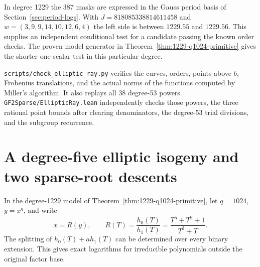 \documentclass[11pt]{article}
\begin{document}
In degree 1229 the 387 masks are expressed in the Gauss period basis of
Section~\ref{sec:period-logs}. With \(J=818085338814611458\) and
\(w=(3,9,9,14,10,12,6,4)\) the left side is between \(1229.55\) and
\(1229.56\). This supplies an independent conditional test for a
candidate passing the known order checks. The proven model generator
in Theorem~\ref{thm:1229-q1024-primitive} gives the shorter one-scalar
test in this particular degree.

\nolinkurl{scripts/check_elliptic_ray.py} verifies the curves, orders,
points above \(b\), Frobenius translations, and the actual norms of
the functions computed by Miller's algorithm. It also replays all
38 degree-53 powers. \nolinkurl{GF2Sparse/EllipticRay.lean} independently
checks those powers, the three rational point bounds after clearing
denominators, the degree-53 trial divisions, and the subgroup recurrence.

\section{A degree-five elliptic isogeny and two sparse-root descents}
\label{sec:quintic-descent}
In the degree-1229 model of Theorem~\ref{thm:1229-q1024-primitive},
let \(q=1024\), \(y=x^q\), and write
\[
  x=R(y),\qquad R(T)=\frac{h_0(T)}{h_1(T)}
     =\frac{T^5+T^2+1}{T^3+T}.
\]
The splitting of \(h_0(T)+a h_1(T)\) can be determined over every
binary extension. This gives exact logarithms for irreducible
polynomials outside the original factor base.
\end{document}
